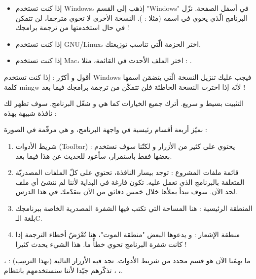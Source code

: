 \begin{itemize}
  \item إذا كنت تستخدم
\textenglish{Windows}،
إذهب إلى القسم
"\textenglish{Windows}"
في أسفل الصفحة. نزّل البرنامج الّذي يحوي
في اسمه (مثلا :
).
النسخة الأخرى لا تحوي مترجما، لن تتمكن في حال استخدمتها من ترجمة برامجك !
  \item إذا كنت تستخدم
\textenglish{GNU/Linux}،
اختر الحزمة الّتي تناسب توزيعتك.

  \item إذا كنت تستخدم
\textenglish{Mac}،
اختر الملف الأحدث في القائمة، مثلا :
.

\end{itemize}

\begin{critical}
أقول و أكرّر : إذا كنت تستخدم
\textenglish{Windows}
فيجب عليك تنزيل النسخة الّتي يتضمَن اسمها كلمة
\textenglish{mingw}
لأنّه إذا اخترت النسخة الخاطئة فلن تتمكّن من ترجمة برامجك فيما بعد !
\end{critical}

التثبيت بسيط و سريع.  أترك جميع الخيارات كما هي و شغّل البرنامج. سوف تظهر لك نافذة شبيهة بهذه :


نميّز أربعة أقسام رئيسية في واجهة البرنامج، و هي مرقّمة في الصورة :

\begin{enumerate}
  \item شريط الأدوات
(\textenglish{Toolbar}) :
يحتوي على كثير من الأزرار و لكنّنا سوف نستخدم بعضها فقط باستمرار، سأعود للحديث عن هذا فيما بعد.
  \item قائمة ملفات المشروع : توجد بيسار النافذة، تحتوي على كلّ الملفات المصدريّة المتعلقة بالبرنامج الذي تعمل عليه. تكون فارغة في البداية لأننا لم ننشئ أي ملف لحد الآن. سوف نبدأ بملأها خلال خمس دقائق من الآن بتقدّمك في هذا الدرس.
  \item المنطقة الرئيسية : هنا المساحة التي تكتب فيها الشفرة المصدرية الخاصة ببرنامجك بلغة الـ\textenglish{C}.
  \item منطقة الإشعار : و يدعوها البعض "منطقة الموت"، هنا تُعْرَضُ أخطاء الترجمة إذا كانت شفرة البرنامج تحوي خطأً ما. هذا الشيء يحدث كثيرا !
\end{enumerate}

ما يهمّنا الآن هو قسم محدد من شريط الأدوات. تجد فيه الأزرار التالية (بهذا الترتيب) :
،
،
،
تذكّرهم جيّدا لأننا سنستخدمهم بانتظام.


